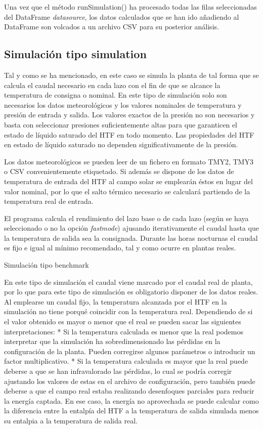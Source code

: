 Una vez que el método runSimulation() ha procesado todas las filas seleccionadas del DataFrame \emph{datasource}, los datos calculados que se han ido añadiendo al DataFrame son volcados a un archivo CSV para su posterior análisis.

\subsection{Simulación tipo simulation}

Tal y como se ha mencionado, en este caso se simula la planta de tal forma que se calcula el caudal necesario en cada lazo con el fin de que se alcance la temperatura de consigna o nominal. En este tipo de simulación solo son necesarios los datos meteorológicos y los valores nominales de temperatura y presión de entrada y salida. Los valores exactos de la presión no son necesarios y basta con seleccionar presiones suficientemente altas para que garanticen el estado de líquido
saturado del HTF en todo momento. Las propiedades del HTF en estado de líquido saturado no dependen significativamente de la presión.

Los datos meteorológicos se pueden leer de un fichero en formato TMY2, TMY3 o CSV convenientemente etiquetado. Si además se dispone de los datos de temperatura de entrada del HTF al campo solar se emplearán éstos en lugar del valor nominal, por lo que el salto térmico necesario se calculará partiendo de la temperatura real de entrada.

El programa calcula el rendimiento del lazo base o de cada lazo (según se haya seleccionado o no la opción \emph{fastmode}) ajusando iterativamente el caudal hasta que la temperatura de salida sea la consignada. Durante las horas nocturnas el caudal es fijo e igual al mínimo recomendado, tal y como ocurre en plantas reales. 

\hypertarget{simulaciuxf3n-tipo-benchmark}{Simulación tipo benchmark}

En este tipo de simulación el caudal viene marcado por el caudal real de planta, por lo que para este tipo de simulación es obligatorio disponer de los datos reales. Al emplearse un caudal fijo, la temperatura alcanzada por el HTF en la simulación no tiene porqué coincidir con la temperatura real. Dependiendo de si el valor obtenido es mayor o menor que el real se pueden sacar las siguientes interpretaciones: 
* Si la  temperatura calculada es menor que la real podemos interpretar que la simulación ha sobredimensionado las pérdidas en la configuración de la planta. Pueden corregirse algunos parámetros o introducir un factor multiplicativo. 
* Si la temperatura calculada es mayor que la real puede deberse a que se han infravalorado las pérdidas, lo cual se podría corregir ajustando los valores de estas en el archivo de configuración, pero también puede deberse a que el campo real estaba realizando desenfoques parciales para reducir la energía captada. En ese caso, la energía no aprovechada se puede calcular como la diferencia entre la entalpía del HTF a la temperatura de salida simulada menos su entalpia a la temperatura de salida real.

